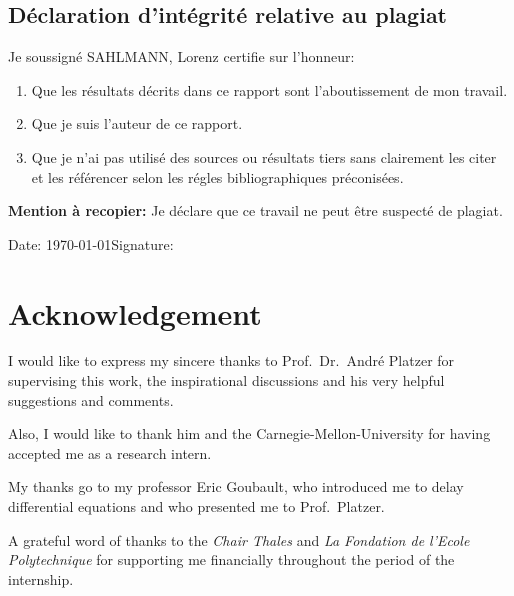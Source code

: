 \begin{otherlanguage}{frenchb}
    \section*{Déclaration d’intégrité relative au plagiat}

    Je soussigné SAHLMANN, Lorenz certifie sur l’honneur:
    \begin{enumerate}
        \item Que les résultats décrits dans ce rapport sont l’aboutissement de mon travail.
        \item Que je suis l’auteur de ce rapport.
        \item Que je n’ai pas utilisé des sources ou résultats tiers sans clairement les citer et les référencer selon les régles bibliographiques préconisées.
    \end{enumerate}

    \textbf{Mention à recopier:}
    Je déclare que ce travail ne peut être suspecté de plagiat.

    \vspace{2cm}
    Date: \today\hfil Signature:

\end{otherlanguage}

\cleardoublepage

\chapter*{Acknowledgement}
    I would like to express my sincere thanks to Prof.~Dr.~André Platzer for supervising this work, the inspirational discussions and his very helpful suggestions and comments.

    Also, I would like to thank him and the Carnegie-Mellon-University for having accepted me as a research intern. 

    My thanks go to my professor Eric Goubault, who introduced me to delay differential equations and who presented me to Prof.~Platzer.

    A grateful word of thanks to the \emph{Chair Thales} and \foreignlanguage{frenchb}{\emph{La Fondation de l'Ecole Polytechnique}} for supporting me financially throughout the period of the internship.
